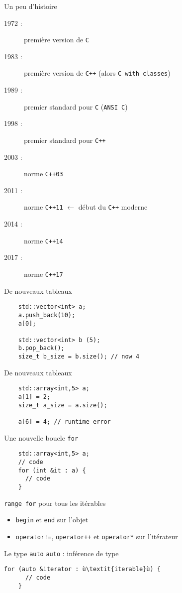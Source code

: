 
\begin{frame}{Un peu d'histoire}
  \begin{description}
  \item[1972 :] première version de \texttt{C}
  \item[1983 :] première version de \texttt{C++} (alors \texttt{C with classes})
  \item[1989 :] premier standard pour \texttt{C} (\texttt{ANSI C})
  \item[1998 :] premier standard pour \texttt{C++}
  \item[2003 :] norme \texttt{C++03}
  \item[2011 :] norme \texttt{C++11} $\leftarrow$ début du \texttt{C++} moderne
  \item[2014 :] norme \texttt{C++14}
  \item[2017 :] norme \texttt{C++17}
  \end{description}
\end{frame}

\begin{frame}[fragile]{De nouveaux tableaux}
  \begin{lstlisting}
    std::vector<int> a;
    a.push_back(10);
    a[0];

    std::vector<int> b (5);
    b.pop_back();
    size_t b_size = b.size(); // now 4
  \end{lstlisting}
\end{frame}

\begin{frame}[fragile]{De nouveaux tableaux}
  \begin{lstlisting}
    std::array<int,5> a;
    a[1] = 2;
    size_t a_size = a.size();

    a[6] = 4; // runtime error
  \end{lstlisting}
\end{frame}

\begin{frame}[fragile]{Une nouvelle boucle \texttt{for}}
  \begin{lstlisting}
    std::array<int,5> a;
    // code
    for (int &it : a) {
      // code
    }
  \end{lstlisting}
  \texttt{range for} pour tous les itérables
  \begin{itemize}
  \item \texttt{begin} et \texttt{end} sur l'objet
  \item \texttt{operator!=}, \texttt{operator++} et \texttt{operator*} sur l'itérateur
  \end{itemize}
\end{frame}

\begin{frame}[fragile]{Le type \texttt{auto}}
  \texttt{auto} : inférence de type
  
  \begin{lstlisting}[escapechar=ù]
    for (auto &iterator : ù\textit{iterable}ù) {
      // code
    }
  \end{lstlisting}
\end{frame}